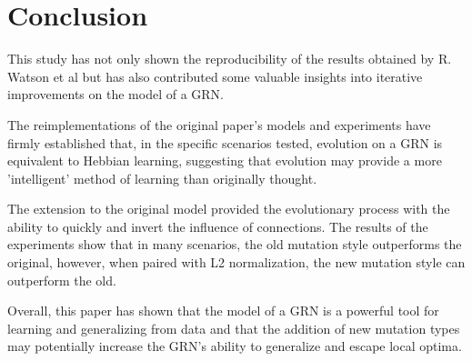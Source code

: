 \documentclass[twocolumn,a4paper,11pt]{article}
\begin{document}
    \section{Conclusion}
    This study has not only shown the reproducibility of the results obtained by R. Watson et al \cite{original-paper} but has also contributed some valuable insights into iterative improvements on the model of a GRN.

    The reimplementations of the original paper's models and experiments have firmly established that, in the specific scenarios tested, evolution on a GRN is equivalent to Hebbian learning, suggesting that evolution may provide a more 'intelligent' method of learning than originally thought.

    The extension to the original model provided the evolutionary process with the ability to quickly and invert the influence of connections. The results of the experiments show that in many scenarios, the old mutation style outperforms the original, however, when paired with L2 normalization, the new mutation style can outperform the old.

    Overall, this paper has shown that the model of a GRN is a powerful tool for learning and generalizing from data and that the addition of new mutation types may potentially increase the GRN's ability to generalize and escape local optima.

    
\end{document}
